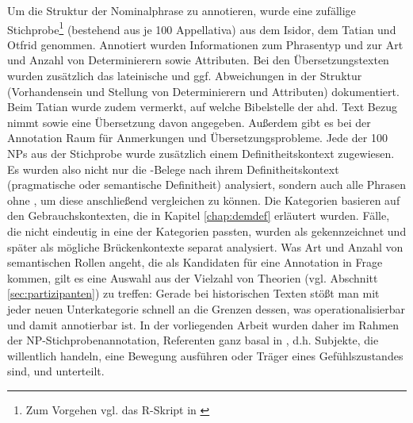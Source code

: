 Um die Struktur der Nominalphrase zu  annotieren, wurde eine zufällige Stichprobe\footnote{Zum Vorgehen vgl. das R-Skript  in \textcite{HZKYL4_2020}} (bestehend aus je 100  Appellativa) aus dem Isidor, dem Tatian und Otfrid genommen. Annotiert wurden Informationen zum Phrasentyp  und zur Art und Anzahl von Determinierern  sowie Attributen. Bei den Übersetzungstexten wurden zusätzlich das lateinische  und ggf. Abweichungen in der Struktur  (Vorhandensein und  Stellung von Determinierern  und Attributen) dokumentiert. Beim Tatian wurde zudem vermerkt, auf welche Bibelstelle der ahd. Text Bezug nimmt sowie eine Übersetzung davon angegeben. Außerdem gibt es bei der Annotation Raum für Anmerkungen und Übersetzungsprobleme.
Jede der 100 NPs  aus der  Stichprobe wurde zusätzlich einem Definitheitskontext  zugewiesen. Es wurden also nicht nur die -Belege nach ihrem Definitheitskontext  (pragmatische   oder semantische  Definitheit) analysiert, sondern auch alle Phrasen  ohne , um diese anschließend vergleichen zu können. 
Die Kategorien basieren auf den Gebrauchskontexten, die in Kapitel \ref{chap:demdef} erläutert wurden. Fälle, die nicht eindeutig in eine der Kategorien passten, wurden als  gekennzeichnet und später als mögliche Brückenkontexte  separat analysiert. 
Was Art und Anzahl von semantischen Rollen  angeht, die als Kandidaten für eine Annotation in Frage kommen, gilt es eine Auswahl aus der Vielzahl von Theorien (vgl. Abschnitt \ref{sec:partizipanten}) zu treffen: Gerade bei historischen Texten stößt man mit jeder neuen Unterkategorie schnell an die Grenzen dessen, was operationalisierbar  und damit annotierbar  ist. In der vorliegenden Arbeit wurden daher im Rahmen der NP-Stichprobenannotation, Referenten ganz basal  in , d.h.  Subjekte, die willentlich handeln,  eine Bewegung ausführen oder Träger eines Gefühlszustandes sind,  und   unterteilt.

